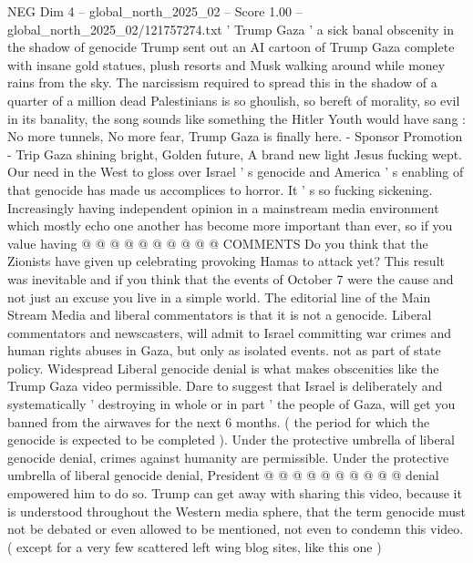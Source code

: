 \begin{textsample}{NEG Dim 4 – global\_north\_2025\_02 – Score 1.00 – global\_north\_2025\_02/121757274.txt}  \label{ex:f4_neg_404}
' Trump Gaza ' a sick banal obscenity in the shadow of genocide Trump sent out an AI cartoon of Trump Gaza complete with insane gold statues, plush resorts and Musk walking around while money rains from the sky.
The narcissism required to spread this in the shadow of a quarter of a million dead Palestinians is so ghoulish, so bereft of morality, so evil in its banality, the song sounds like something the Hitler Youth would have sang : No more tunnels, No more fear, Trump Gaza is finally here. - Sponsor Promotion - Trip Gaza shining bright, Golden future, A brand new light Jesus fucking wept.
Our need in the West to gloss over Israel ' s genocide and America ' s enabling of that genocide has made us accomplices to horror.
It ' s so fucking sickening.
Increasingly having independent opinion in a mainstream media environment which mostly echo one another has become more important than ever, so if you value having @ @ @ @ @ @ @ @ @ @ COMMENTS Do you think that the Zionists have given up celebrating provoking Hamas to attack yet?
This result was inevitable and if you think that the events of October 7 were the cause and not just an excuse you live in a simple world.
The editorial line of the Main Stream Media and liberal commentators is that it is not a genocide.
Liberal commentators and newscasters, will admit to Israel committing war crimes and human rights abuses in Gaza, but only as isolated events. not as part of state policy.
Widespread Liberal genocide denial is what makes obscenities like the Trump Gaza video permissible.
Dare to suggest that Israel is deliberately and systematically ' destroying in whole or in part ' the people of Gaza, will get you banned from the airwaves for the next 6 months. ( the period for which the genocide is expected to be completed ).
Under the protective umbrella of liberal genocide denial, crimes against humanity are permissible.
Under the protective umbrella of liberal genocide denial, President @ @ @ @ @ @ @ @ @ @ denial empowered him to do so.
Trump can get away with sharing this video, because it is understood throughout the Western media sphere, that the term genocide must not be debated or even allowed to be mentioned, not even to condemn this video. ( except for a very few scattered left wing blog sites, like this one )

\end{textsample}
